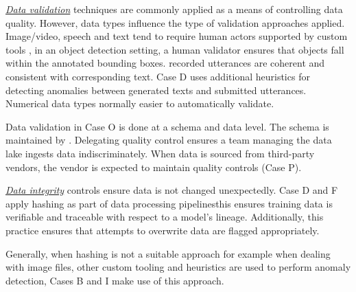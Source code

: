 \underline{\emph{Data validation}}
techniques are commonly applied as a means of controlling data quality. However, data types influence the type of validation approaches applied. \DIFaddbegin {}\DIFaddend Image/video, speech and text tend to require human actors supported by custom tools \DIFdelbegin {}\DIFdelend \DIFaddbegin {}\DIFaddend , in an object detection setting, a human validator ensures that objects fall within the annotated bounding boxes. \DIFdelbegin {}\DIFdelend \DIFaddbegin {}\DIFaddend recorded utterances are coherent and consistent with corresponding text. Case D uses additional heuristics for detecting anomalies between generated texts and submitted utterances. Numerical data types \DIFaddbegin {}\DIFaddend normally easier to automatically validate.

Data validation in Case O is done at a schema and data level. The schema is maintained by \DIFdelbegin {}\textit{} %
\DIFdelend \DIFaddbegin {}\DIFaddend . Delegating quality control ensures a team managing the data lake ingests data indiscriminately. When data is sourced from third-party vendors, the vendor is expected to maintain quality controls (Case P). %

\underline{\emph{Data integrity}}
controls ensure data is not changed unexpectedly. Case D and F apply hashing as part of data processing pipelines\DIFaddbegin \DIFadd{; }\DIFaddend this ensures training data is verifiable and traceable with respect to a model's lineage. Additionally, this practice ensures that attempts to overwrite data are flagged appropriately.

Generally, when hashing is not a suitable approach for example when dealing with image files, other custom tooling and heuristics are used to perform anomaly detection, Cases B and I make use of this approach. %


